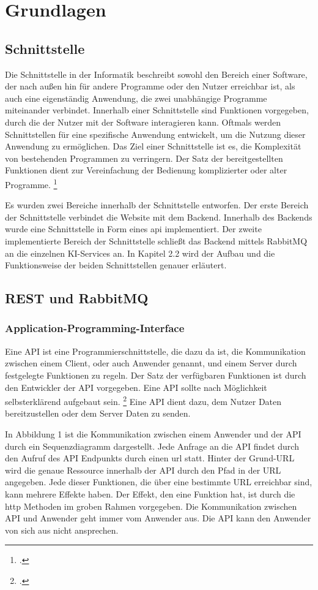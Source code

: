 \section{Grundlagen}
\subsection{Schnittstelle}
Die Schnittstelle in der Informatik beschreibt sowohl den Bereich einer Software, der nach außen hin für andere Programme oder den Nutzer erreichbar ist, als auch eine eigenständig Anwendung, die zwei unabhängige Programme miteinander verbindet. Innerhalb einer Schnittstelle sind Funktionen vorgegeben, durch die der Nutzer mit der Software interagieren kann. Oftmals werden Schnittstellen für eine spezifische Anwendung entwickelt, um die Nutzung dieser Anwendung zu ermöglichen. Das Ziel einer Schnittstelle ist es, die Komplexität von bestehenden Programmen zu verringern. Der Satz der bereitgestellten Funktionen dient zur Vereinfachung der Bedienung komplizierter oder alter Programme. 
\footcite{sneed2006integrating}

Es wurden zwei Bereiche innerhalb der Schnittstelle entworfen. Der erste Bereich der Schnittstelle verbindet die Website mit dem Backend. Innerhalb des Backends wurde eine Schnittstelle in Form eines \ac{api} implementiert. Der zweite implementierte Bereich der Schnittstelle schließt das Backend mittels RabbitMQ an die einzelnen KI-Services an. In Kapitel 2.2 wird der Aufbau und die Funktionsweise der beiden Schnittstellen genauer erläutert.

\subsection{REST und RabbitMQ}
\subsubsection{Application-Programming-Interface}
Eine API ist eine Programmierschnittstelle, die dazu da ist, die Kommunikation zwischen einem Client, oder auch Anwender genannt, und einem Server durch festgelegte Funktionen zu regeln. Der Satz der verfügbaren Funktionen ist durch den Entwickler der API vorgegeben. Eine API sollte nach Möglichkeit selbsterklärend aufgebaut sein. \footcite{bloch2006design} Eine API dient dazu, dem Nutzer Daten bereitzustellen oder dem Server Daten zu senden.

In Abbildung 1 ist die Kommunikation zwischen einem Anwender und der API durch ein Sequenzdiagramm dargestellt. Jede Anfrage an die API findet durch den Aufruf des API Endpunkts durch einen \ac{url} statt. Hinter der Grund-URL wird die genaue Ressource innerhalb der API durch den Pfad in der URL angegeben. Jede dieser Funktionen, die über eine bestimmte URL erreichbar sind, kann mehrere Effekte haben. Der Effekt, den eine Funktion hat, ist durch die \ac{http} Methoden im groben Rahmen vorgegeben. Die Kommunikation zwischen API und Anwender geht immer vom Anwender aus. Die API kann den Anwender von sich aus nicht ansprechen. 

